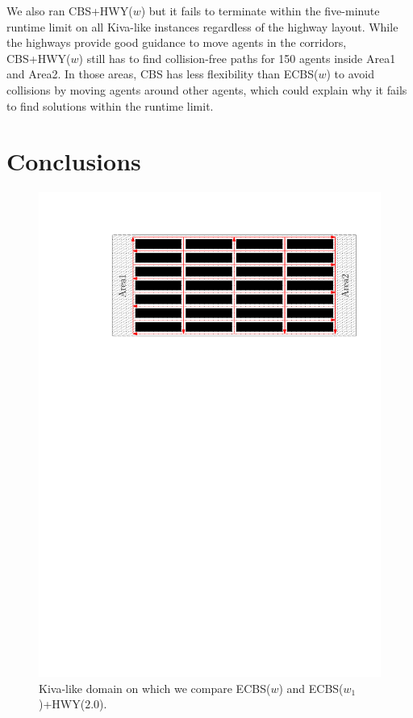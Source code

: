 \documentclass[letterpaper]{article}
\theoremstyle{definition}
\begin{document}
We also ran CBS+HWY($w$) but it fails to terminate within the five-minute
runtime limit on all Kiva-like instances regardless of the highway
layout. While the highways provide good guidance to move agents in the
corridors, CBS+HWY($w$) still has to find collision-free paths for 150 agents
inside Area1 and Area2. In those areas, CBS has less flexibility than
ECBS($w$) to avoid collisions by moving agents around other agents, which
could explain why it fails to find solutions within the runtime limit.

\section{Conclusions}

\begin{figure}[t]
  \centering
	\includegraphics[width=\columnwidth]{Figs/Kiva_Domain.pdf}
  \caption{Kiva-like domain on which we compare ECBS($w$) and ECBS($w_1$)+HWY($2.0$).}
  \label{exampleKiva_fig}
\end{figure}
\end{document}
